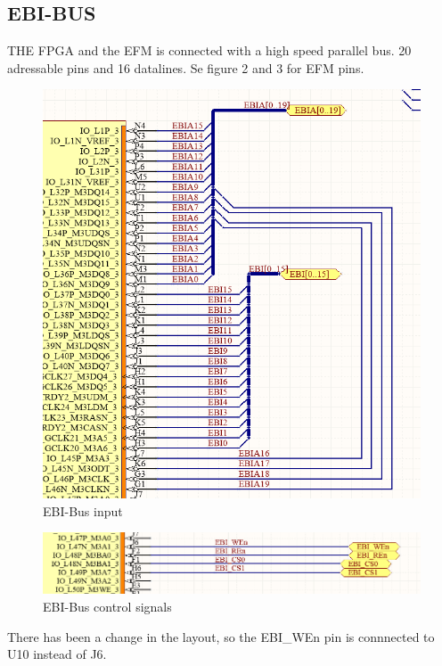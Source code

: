 \subsection{EBI-BUS}
THE FPGA and the EFM is connected with a high speed parallel bus. 20 adressable pins and 16 datalines.  Se figure 2 and 3 for EFM pins.


\begin{figure}
    \includegraphics[width=\linewidth]{img/EBI-bus.png}
    \caption{EBI-Bus input}
    \label{fig:ebibus}
\end{figure}

\begin{figure}
    \includegraphics[width=\linewidth]{img/EBI-bus_2.png}
    \caption{EBI-Bus control signals}
    \label{fig:ebicontroll}
\end{figure}
There has been a change in the layout, so the EBI\_WEn pin is connnected to U10 instead of J6.

